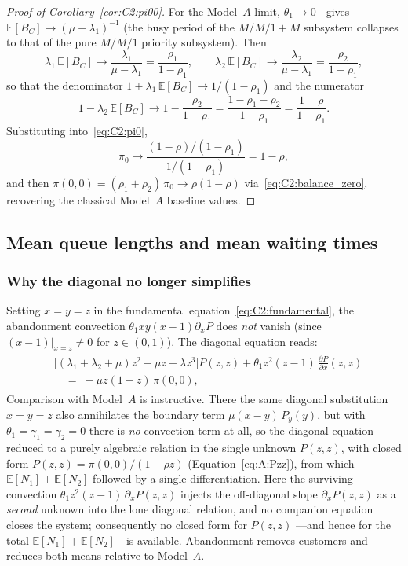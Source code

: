 \begin{proof}[Proof of Corollary~\ref{cor:C2:pi00}]
    For the Model~$A$ limit, $\theta_1\to 0^+$ gives $\mathbb{E}[B_C]\to(\mu-\lambda_1)^{-1}$ (the busy period of the $M/M/1+M$ subsystem collapses to that of the pure $M/M/1$ priority subsystem). Then
    \[
        \lambda_1\,\mathbb{E}[B_C]\to\frac{\lambda_1}{\mu-\lambda_1}=\frac{\rho_1}{1-\rho_1},
        \qquad
        \lambda_2\,\mathbb{E}[B_C]\to\frac{\lambda_2}{\mu-\lambda_1}=\frac{\rho_2}{1-\rho_1},
    \]
    so that the denominator $1+\lambda_1\,\mathbb{E}[B_C]\to 1/(1-\rho_1)$ and the numerator
    \[
        1-\lambda_2\,\mathbb{E}[B_C]\to 1-\frac{\rho_2}{1-\rho_1}=\frac{1-\rho_1-\rho_2}{1-\rho_1}=\frac{1-\rho}{1-\rho_1}.
    \]
    Substituting into~\eqref{eq:C2:pi0},
    \[
        \pi_0\to\frac{(1-\rho)/(1-\rho_1)}{1/(1-\rho_1)}=1-\rho,
    \]
    and then $\pi(0,0)=(\rho_1+\rho_2)\,\pi_0\to\rho(1-\rho)$ via~\eqref{eq:C2:balance_zero}, recovering the classical Model~$A$ baseline values.
\end{proof}

\subsection{Mean queue lengths and mean waiting times}

\subsubsection*{Why the diagonal no longer simplifies}

Setting $x=y=z$ in the fundamental equation~\eqref{eq:C2:fundamental}, the
abandonment convection $\theta_1 xy(x-1)\partial_xP$ does \emph{not} vanish
(since $(x-1)|_{x=z}\neq0$ for $z\in(0,1)$).  The diagonal equation reads:
\begin{align}
    \begin{split}
        &\bigl[(\lambda_1{+}\lambda_2{+}\mu)z^2-\mu z-\lambda z^3\bigr]P(z,z)
        + \theta_1 z^2(z-1)\,\frac{\partial P}{\partial x}(z,z) \\
        &\quad=\; -\mu z(1-z)\,\pi(0,0),
    \end{split}
    \label{eq:C2:diag}
\end{align}
Comparison with Model~$A$ is instructive.  There the same diagonal substitution
$x=y=z$ also annihilates the boundary term $\mu(x-y)\,P_y(y)$, but with
$\theta_1=\gamma_1=\gamma_2=0$ there is \emph{no} convection term at all, so the
diagonal equation reduced to a purely algebraic relation in the single unknown
$P(z,z)$, with closed form $P(z,z)=\pi(0,0)/(1-\rho z)$
(Equation~\eqref{eq:A:Pzz}), from which $\mathbb{E}[N_1]+\mathbb{E}[N_2]$ followed
by a single differentiation.  Here the surviving convection
$\theta_1 z^2(z-1)\,\partial_x P(z,z)$ injects the off-diagonal slope
$\partial_x P(z,z)$ as a \emph{second} unknown into the lone diagonal relation, and
no companion equation closes the system; consequently no closed form for $P(z,z)$
---and hence for the total $\mathbb{E}[N_1]+\mathbb{E}[N_2]$---is available.
Abandonment removes customers and reduces both means relative to Model~$A$.

